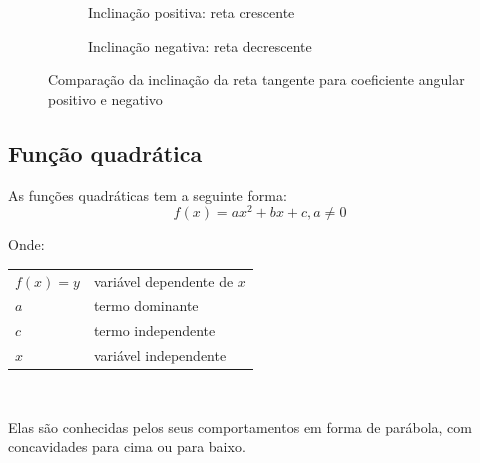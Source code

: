 \documentclass[12pt,openright,twoside,a4paper]{article}
\makeatletter
\theoremstyle{definition}
\newenvironment{condicoes}[1][Onde:]
{#1 \begin{tabular}[t]{>{$}l<{$} @{${} \implies {}$} l}}
	{\end{tabular}\\[\belowdisplayskip]}
\makeatother
\begin{document}
	\begin{figure}[h]
		\centering
		\begin{subfigure}[t]{0.45\textwidth}
			\centering
			\caption{Inclinação positiva: reta crescente}
		\end{subfigure}
		\hspace{1cm}
		\begin{subfigure}[t]{0.45\textwidth}
			\centering
			\caption{Inclinação negativa: reta decrescente}
		\end{subfigure}
		\caption{Comparação da inclinação da reta tangente para coeficiente angular positivo e negativo}
	\end{figure}
	
	\pagebreak
	\subsection{Função quadrática}
	As funções quadráticas tem a seguinte forma:
	\begin{equation}
		\boxed{f(x) = ax^2 + bx + c, a \neq 0}
	\end{equation}
	
	\begin{condicoes}
		f(x)=y & variável dependente de $x$\\
		a & termo dominante\\
		c & termo independente\\
		x & variável independente
	\end{condicoes}
	
	Elas são conhecidas pelos seus comportamentos em forma de parábola, com concavidades para cima ou para baixo.
	
\end{document}
